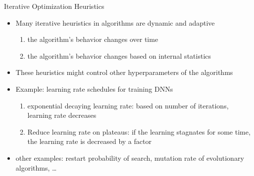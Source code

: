 \begin{frame}[c]{Iterative Optimization Heuristics}
	
	\begin{itemize}
		\item Many iterative heuristics in algorithms are dynamic and adaptive
		\begin{enumerate}
			\item the algorithm's behavior changes over time
			\item the algorithm's behavior changes based on internal statistics
		\end{enumerate}
		\medskip
		\pause
		\item These heuristics might control other hyperparameters of the algorithms
		\pause
		\smallskip
		\item Example: learning rate schedules for training DNNs
		\begin{enumerate}
			\item exponential decaying learning rate: based on number of iterations, learning rate decreases
			\pause
			\item Reduce learning rate on plateaus: if the learning stagnates for some time, the learning rate is decreased by a factor
		\end{enumerate}
		\pause
		\smallskip
		\item other examples: restart probability of search, mutation rate of evolutionary algorithms, \ldots  
		
	\end{itemize}
	
\end{frame}
